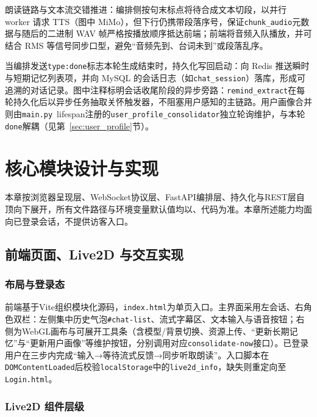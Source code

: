 \documentclass{base}
\begin{document}
朗读链路与文本流交错推进：编排侧按句末标点将待合成文本切段，以并行 worker 请求 TTS（图中 MiMo），但下行仍携带段落序号，保证\texttt{chunk\_audio}元数据与随后的二进制 WAV 帧严格按播放顺序抵达前端；前端将音频入队播放，并可结合 RMS 等信号同步口型，避免``音频先到、台词未到''或段落乱序。

当编排发送\texttt{type:done}标志本轮生成结束时，持久化写回启动：向 Redis 推送瞬时与短期记忆列表项，并向 MySQL 的会话日志（如\texttt{chat\_session}）落库，形成可追溯的对话记录。图中注释标明会话收尾阶段的异步旁路：\texttt{remind\_extract}在每轮持久化后以异步任务抽取关怀触发器，不阻塞用户感知的主链路。用户画像合并则由\texttt{main.py}~lifespan注册的\texttt{user\_profile\_consolidator}独立轮询维护，与本轮\texttt{done}解耦（见第~\ref{sec:user_profile}节）。

\chapter{核心模块设计与实现}

本章按浏览器呈现层、WebSocket协议层、FastAPI编排层、持久化与REST层自顶向下展开，所有文件路径与环境变量默认值均以、代码为准。本章所述能力均面向已登录会话，不提供访客入口。

\section{前端页面、Live2D 与交互实现}

\subsection{布局与登录态}

前端基于Vite组织模块化源码，\texttt{index.html}为单页入口。主界面采用左会话、右角色双栏：左侧集中历史气泡\texttt{\#chat-list}、流式字幕区、文本输入与语音按钮；右侧为WebGL画布与可展开工具条（含模型/背景切换、资源上传、``更新长期记忆''与``更新用户画像''等维护按钮，分别调用对应\texttt{consolidate-now}接口）。已登录用户在三步内完成``输入→等待流式反馈→同步听取朗读''。入口脚本在\texttt{DOMContentLoaded}后校验\texttt{localStorage}中的\texttt{live2d\_info}，缺失则重定向至\texttt{Login.html}。

\subsection{Live2D 组件层级}
\end{document}
